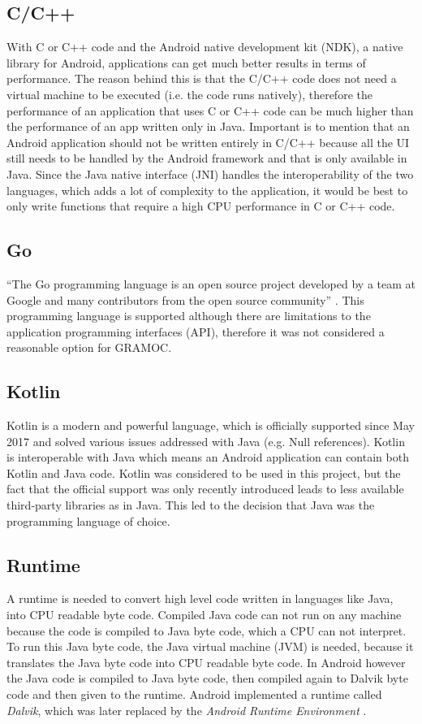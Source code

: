 \subsection{C/C++}
With C or C++ code and the Android native development kit (NDK), a native library for Android, applications can get much better results in terms of performance. The reason behind this is that the C/C++ code does not need a virtual machine to be executed (i.e. the code runs natively), therefore the performance of an application that uses C or C++ code can be much higher than the performance of an app written only in Java. Important is to mention that an Android application should not be written entirely in C/C++ because all the UI still needs to be handled by the Android framework and that is only available in Java. Since the Java native interface (JNI) handles the interoperability of the two languages, which adds a lot of complexity to the application, it would be best to only write functions that require a high CPU performance in C or C++ code.

\subsection{Go}
``The Go programming language is an open source project developed by a team at Google and many contributors from the open source community'' \autocite{GoProject}. This programming language is supported although there are limitations to the application programming interfaces (API), therefore it was not considered a reasonable option for GRAMOC.

\subsection{Kotlin}
Kotlin is a modern and powerful language, which is officially supported since May 2017 and solved various issues addressed with Java (e.g. Null references). Kotlin is interoperable with Java which means an Android application can contain both Kotlin and Java code. Kotlin was considered to be used in this project, but the fact that the official support was only recently introduced leads to less available third-party libraries as in Java. This led to the decision that Java was the programming language of choice.

\subsection{Runtime}
A runtime is needed to convert high level code written in languages like Java, into CPU readable byte code. Compiled Java code can not run on any machine because the code is compiled to Java byte code, which a CPU can not interpret. To run this Java byte code, the Java virtual machine (JVM) is needed, because it translates the Java byte code into CPU readable byte code. In Android however the Java code is compiled to Java byte code, then compiled again to Dalvik byte code and then given to the runtime. Android implemented a runtime called \textit{Dalvik}, which was later replaced by the \textit{Android Runtime Environment} \autocite{artanddalvik}.

